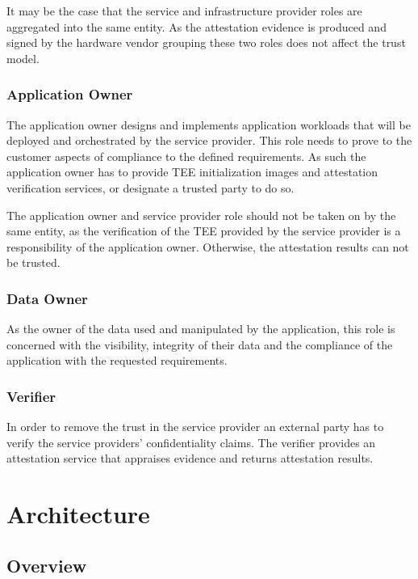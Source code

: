 It may be the case that the service and infrastructure provider roles are
aggregated into the same entity. As the attestation evidence is produced and
signed by the hardware vendor grouping these two roles does not affect the trust
model.

\subsubsection*{Application Owner}

The application owner designs and implements application workloads that will be
deployed and orchestrated by the service provider. This role needs to prove to
the customer aspects of compliance to the defined requirements. As such the
application owner has to provide TEE initialization images and attestation
verification services, or designate a trusted party to do so.

The application owner and service provider role should not be taken on by the
same entity, as the verification of the TEE provided by the service provider is
a responsibility of the application owner. Otherwise, the attestation results
can not be trusted.

\subsubsection*{Data Owner}

As the owner of the data used and manipulated by the application, this role is
concerned with the visibility, integrity of their data and the compliance of the
application with the requested requirements.

\subsubsection*{Verifier}

In order to remove the trust in the service provider an external party has to
verify the service providers' confidentiality claims. The verifier provides an
attestation service that appraises evidence and returns attestation results.

\section{Architecture}
\label{sec:proposal:architecture}

\subsection{Overview}

